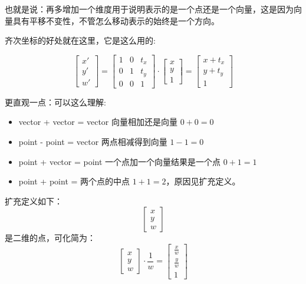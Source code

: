 \documentclass[UTF8]{ctexbook}
\begin{document}
{{{{        也就是说：再多增加一个维度用于说明表示的是一个点还是一个向量，这是因为向量具有平移不变性，不管怎么移动表示的始终是一个方向。

        齐次坐标的好处就在这里，它是这么用的:

        $$\left[\begin{array}{c}
              x\prime \\
              y\prime \\
              w\prime
            \end{array}\right]
          =
          \left[\begin{matrix}
              1 & 0 & t_x \\
              0 & 1 & t_y \\
              0 & 0 & 1
            \end{matrix}\right]
          \cdot
          \left[\begin{array}{c}
              x \\
              y \\
              1
            \end{array}\right]
          =
          \left[\begin{array}{c}
              x + t_x \\
              y + t_y \\
              1
            \end{array}\right]
        $$

        更直观一点：可以这么理解:
        \begin{itemize}
          \item vector + vector = vector 向量相加还是向量 $0 + 0 = 0$
          \item point - point = vector 两点相减得到向量 $1 - 1 = 0$
          \item point + vector = point 一个点加一个向量结果是一个点 $0 + 1 = 1$
          \item point + point = 两个点的中点 $1 + 1 = 2$，原因见扩充定义。
        \end{itemize}
        扩充定义如下：
        $$\left[\begin{array}{c}
              x \\
              y \\
              w
            \end{array}\right]$$是二维的点，可化简为：$$\left[\begin{array}{c}
              x \\
              y \\
              w
            \end{array}\right]\cdot\frac{1}{w} = \left[\begin{array}{c}
              \frac{x}{w} \\
              \frac{y}{w} \\
              1
            \end{array}\right]$$

}}}}
\end{document}
